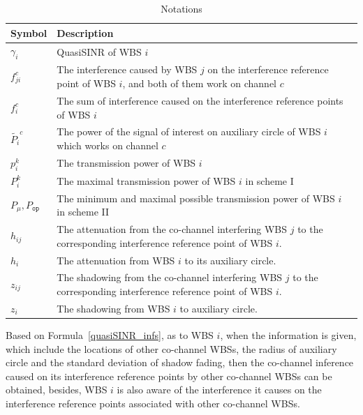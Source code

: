 \documentclass[times]{ettauth}
\theoremstyle{mytheoremstyle}
\theoremstyle{mytheoremstyle}
\theoremstyle{mytheoremstyle}
\begin{document}
\begin{table}[h]
\caption{Notations}
\label{tab1}
\centering
\begin{tabular}{l p{6.5cm}}
\toprule
Symbol & Description \\
\midrule
$\gamma_i$ & QuasiSINR of WBS $i$\\
$f_{ji}^c$  & The interference caused by WBS $j$ on the interference reference point of WBS $i$, and both of them work on channel $c$\\
$f_i^c$ & The sum of interference caused on the interference reference points of WBS $i$ \\
$\tilde{P_i}^c$ & The power of the signal of interest on auxiliary circle of WBS $i$ which works on channel $c$     \\
$p_i^k$		& The transmission power of WBS $i$\\
$P_i^k$		& The maximal transmission power of WBS $i$ in scheme I\\
$P_\mu, P_{\mathtt{op}}$		& The minimum and maximal possible transmission power of WBS $i$ in scheme II\\
$h_{ij}$ & The attenuation from the co-channel interfering WBS $j$ to the corresponding interference reference point of WBS $i$.\\
$h_{i}$ & The attenuation from WBS $i$ to its auxiliary circle.\\
$z_{ij}$ & The shadowing from the co-channel interfering  WBS $j$ to the corresponding interference reference point of WBS $i$.\\
$z_{i}$ & The shadowing from WBS $i$ to auxiliary circle.\\		
\bottomrule
\end{tabular}
\end{table}




Based on Formula~\ref{quasiSINR_infs}, as to WBS $i$, when the information is given, which include the locations of other co-channel WBSs, the radius of auxiliary circle and the standard deviation of shadow fading, then the co-channel inference caused on its interference reference points by other co-channel WBSs can be obtained, besides, WBS $i$ is also aware of the interference it causes on the interference reference points associated with other co-channel WBSs.
\end{document}
